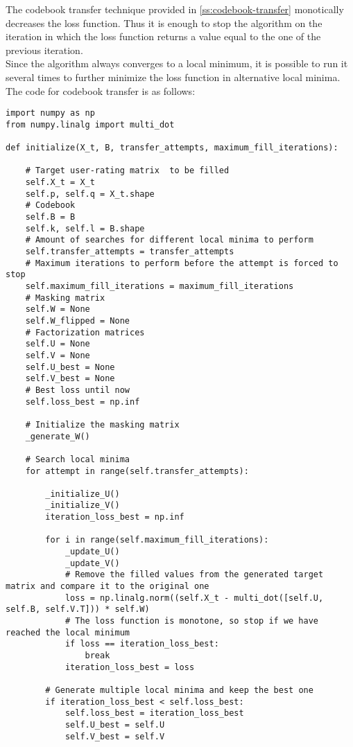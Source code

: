 The codebook transfer technique provided in \autoref{ss:codebook-transfer} monotically decreases the loss function. Thus it is enough to stop the algorithm on the iteration in which the loss function returns a value equal to the one of the previous iteration.\\
Since the algorithm always converges to a local minimum, it is possible to run it several times to further minimize the loss function in alternative local minima.\\
The code for codebook transfer is as follows:
\begin{verbatim}
import numpy as np
from numpy.linalg import multi_dot

def initialize(X_t, B, transfer_attempts, maximum_fill_iterations):

    # Target user-rating matrix  to be filled
    self.X_t = X_t
    self.p, self.q = X_t.shape
    # Codebook
    self.B = B
    self.k, self.l = B.shape
    # Amount of searches for different local minima to perform
    self.transfer_attempts = transfer_attempts
    # Maximum iterations to perform before the attempt is forced to stop
    self.maximum_fill_iterations = maximum_fill_iterations
    # Masking matrix
    self.W = None
    self.W_flipped = None
    # Factorization matrices
    self.U = None
    self.V = None
    self.U_best = None
    self.V_best = None
    # Best loss until now
    self.loss_best = np.inf
    
    # Initialize the masking matrix
    _generate_W()
    
    # Search local minima
    for attempt in range(self.transfer_attempts):
    
        _initialize_U()
        _initialize_V()
        iteration_loss_best = np.inf
        
        for i in range(self.maximum_fill_iterations):
            _update_U()
            _update_V()
            # Remove the filled values from the generated target matrix and compare it to the original one
            loss = np.linalg.norm((self.X_t - multi_dot([self.U, self.B, self.V.T])) * self.W)
            # The loss function is monotone, so stop if we have reached the local minimum
            if loss == iteration_loss_best:
                break
            iteration_loss_best = loss

        # Generate multiple local minima and keep the best one
        if iteration_loss_best < self.loss_best:
            self.loss_best = iteration_loss_best
            self.U_best = self.U
            self.V_best = self.V


\end{verbatim}
